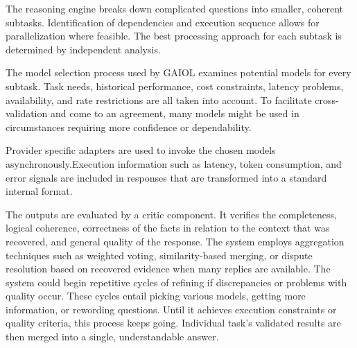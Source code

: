 \documentclass[final,5p,times,twocolumn,authoryear,draft]{elsarticle}
\begin{document}
The reasoning engine breaks down complicated questions into smaller, coherent subtasks. Identification of dependencies and execution sequence allows for parallelization where feasible. The best processing approach for each subtask is determined by independent analysis.

The model selection process used by GAIOL examines potential models for every subtask. Task needs, historical performance, cost constraints, latency problems, availability, and rate restrictions are all taken into account. To facilitate cross-validation and come to an agreement, many models might be used in circumstances requiring more confidence or dependability.

Provider specific adapters are used to invoke the chosen models asynchronously.Execution information such as latency, token consumption, and error signals are included in responses that are transformed into a standard internal format.

The outputs are evaluated by a critic component. It verifies the completeness, logical coherence, correctness of the facts in relation to the context that was recovered, and general quality of the response. The system employs aggregation techniques such as weighted voting, similarity-based merging, or dispute resolution based on recovered evidence when many replies are available. The system could begin repetitive cycles of refining if discrepancies or problems with quality occur. These cycles entail picking various models, getting more information, or rewording questions. Until it achieves execution constraints or quality criteria, this process keeps going. Individual task's validated results are then merged into a single, understandable answer.



\end{document}
